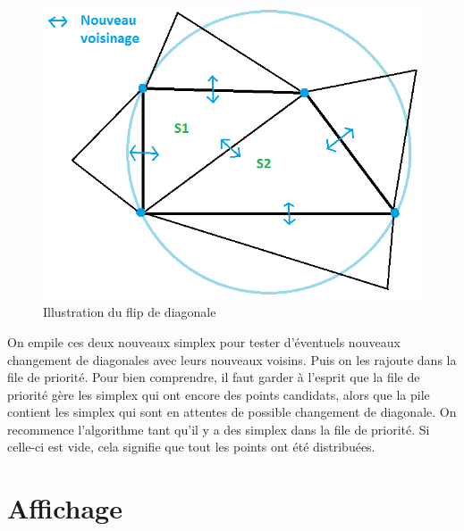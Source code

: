 \documentclass[10pt,a4paper]{report}
\begin{document}
\begin{figure}[h]
	\begin{center}
  		\includegraphics[scale=0.5]{DivisionDiagPossibleCercleApres.png} 
  	\end{center}
   	\caption{Illustration du flip de diagonale}
	\label{Illustration du flip de diagonale}
\end{figure}

\hspace*{10mm}On empile ces deux nouveaux simplex pour tester d'éventuels nouveaux changement de diagonales avec leurs nouveaux voisins. Puis on les rajoute dans la file de priorité.
\newline
Pour bien comprendre, il faut garder à l'esprit que la file de priorité gère les simplex qui ont encore des points candidats, alors que la pile contient les simplex qui sont en attentes de possible changement de diagonale. 
\newline
On recommence l'algorithme tant qu'il y a des simplex dans la file de priorité. Si celle-ci est vide, cela signifie que tout les points ont été distribuées.

\chapter{Affichage}
	
\end{document}
